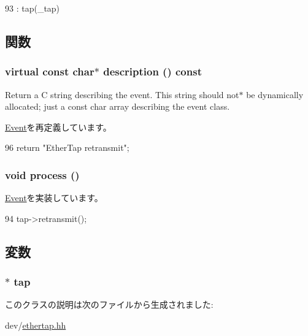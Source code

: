 \begin{DoxyCode}
93 : tap(_tap) {}
\end{DoxyCode}


\subsection{関数}
\hypertarget{classEtherTap_1_1TxEvent_a130ddddf003422b413e2e891b1b80e8f}{
\subsubsection[{description}]{\setlength{\rightskip}{0pt plus 5cm}virtual const char$\ast$ description () const}}
\label{classEtherTap_1_1TxEvent_a130ddddf003422b413e2e891b1b80e8f}
Return a C string describing the event. This string should not$\ast$ be dynamically allocated; just a const char array describing the event class. 

\hyperlink{classEvent_a130ddddf003422b413e2e891b1b80e8f}{Event}を再定義しています。


\begin{DoxyCode}
96             { return "EtherTap retransmit"; }
\end{DoxyCode}
\hypertarget{classEtherTap_1_1TxEvent_a2e9c5136d19b1a95fc427e0852deab5c}{
\subsubsection[{process}]{\setlength{\rightskip}{0pt plus 5cm}void process ()}}
\label{classEtherTap_1_1TxEvent_a2e9c5136d19b1a95fc427e0852deab5c}


\hyperlink{classEvent_a142b75b68a6291400e20fb0dd905b1c8}{Event}を実装しています。


\begin{DoxyCode}
94 { tap->retransmit(); }
\end{DoxyCode}


\subsection{変数}
\hypertarget{classEtherTap_1_1TxEvent_afceac4e4f9153ef0f38b7c423422dd2e}{
\subsubsection[{tap}]{$\ast$ {\bf tap}}}
\label{classEtherTap_1_1TxEvent_afceac4e4f9153ef0f38b7c423422dd2e}


このクラスの説明は次のファイルから生成されました:\begin{DoxyCompactItemize}
\item 
dev/\hyperlink{ethertap_8hh}{ethertap.hh}\end{DoxyCompactItemize}
